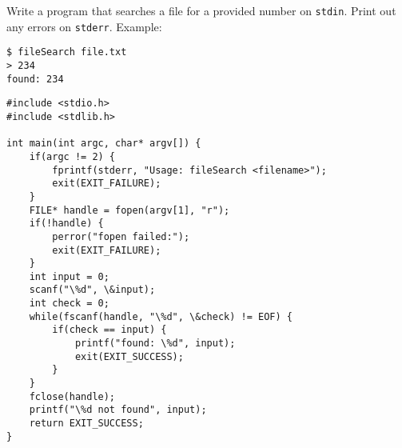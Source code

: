 Write a program that searches a file for a provided number on \texttt{stdin}.
Print out any errors on \texttt{stderr}.
Example:

\begin{lstlisting}
$ fileSearch file.txt
> 234
found: 234
\end{lstlisting}

\begin{answer}
\begin{lstlisting}
#include <stdio.h>
#include <stdlib.h>

int main(int argc, char* argv[]) {
	if(argc != 2) {
		fprintf(stderr, "Usage: fileSearch <filename>");
		exit(EXIT_FAILURE);
	}
	FILE* handle = fopen(argv[1], "r");
	if(!handle) {
		perror("fopen failed:");
		exit(EXIT_FAILURE);
	}
	int input = 0;
	scanf("\%d", \&input);
	int check = 0;
	while(fscanf(handle, "\%d", \&check) != EOF) {
		if(check == input) {
			printf("found: \%d", input);
			exit(EXIT_SUCCESS);
		}
	}
	fclose(handle);
	printf("\%d not found", input);
	return EXIT_SUCCESS;
}
\end{lstlisting}
\end{answer}
